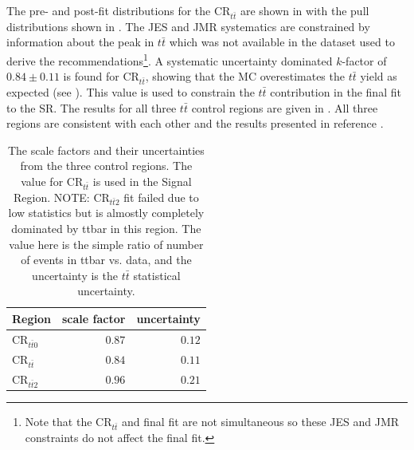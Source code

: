 The pre- and post-fit distributions for the $\text{CR}_{t\bar{t}}$ are shown in
 with the pull distributions shown in
.  The JES and JMR systematics are constrained
by information about the peak in $t\bar{t}$ which was not available in the
dataset used to derive the recommendations\footnote{Note that the
$\text{CR}_{t\bar{t}}$ and final fit are not simultaneous so these JES and JMR
constraints do not affect the final fit.}. A systematic uncertainty dominated
$k$-factor of $0.84 \pm 0.11$ is found for $\text{CR}_{t\bar{t}}$, showing that
the MC overestimates the $t\bar{t}$ yield as expected (see
). This value is used to constrain the
$t\bar{t}$ contribution in the final fit to the SR. The results for all three
$t\bar{t}$ control regions are given in .  All three
regions are consistent with each other and the results presented in reference
\cite{ATLAS:2016jct}.

\begin{table}
  \centering
  \caption{The \ttbar scale factors and their uncertainties from the three \ttbar
control regions. The value for $\text{CR}_{t\bar{t}}$ is used in the Signal Region. NOTE:
$\text{CR}_{t\bar{t}2}$ fit failed due to low statistics but is almostly completely dominated
by ttbar in this region.  The value here is the simple ratio of number of events in ttbar
vs. data, and the uncertainty is the $t\bar{t}$ statistical uncertainty.}
  \begin{tabular}{@{}lrr@{}}
    \toprule
    Region & scale factor & uncertainty \\
    \midrule
    $\text{CR}_{t\bar{t}0}$ & $0.87$ & $0.12$ \\
    $\text{CR}_{t\bar{t}}$  & $0.84$ & $0.11$ \\
    $\text{CR}_{t\bar{t}2}$ & $0.96$ & $0.21$ \\
    \bottomrule
  \end{tabular}
  \label{table:ttbar_kfactors}
\end{table}

